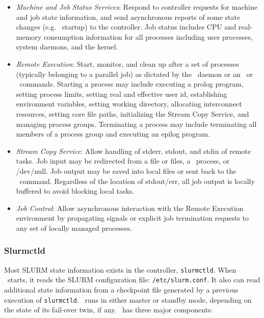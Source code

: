 \begin{itemize}
\item {\em Machine and Job Status Services}:  Respond to controller 
requests for machine and job state information, and send asynchronous 
reports of some state changes (e.g. \slurmd\ startup) to the controller.
Job status includes CPU and real-memory consumption information for all 
processes including user processes, system daemons, and the kernel. 

\item {\em Remote Execution}: Start, monitor, and clean up after a set
of processes (typically belonging to a parallel job) as dictated by the
\slurmctld\ daemon or an \srun\ or \scancel\ commands. Starting a process may
include executing a prolog program, setting process limits, setting real
and effective user id, establishing environment variables, setting working
directory, allocating interconnect resources, setting core file paths,
initializing the Stream Copy Service, and managing
process groups. Terminating a process may include terminating all members
of a process group and executing an epilog program.

\item {\em Stream Copy Service}: Allow handling of stderr, stdout, and
stdin of remote tasks. Job input may be redirected from a file or files, a
\srun\ process, or /dev/null.  Job output may be saved into local files or
sent back to the \srun\ command. Regardless of the location of stdout/err,
all job output is locally buffered to avoid blocking local tasks.

\item {\em Job Control}: Allow asynchronous interaction with the
Remote Execution environment by propagating signals or explicit job
termination requests to any set of locally managed processes.

\end{itemize}

\subsubsection{Slurmctld}

Most SLURM state information exists in the controller, {\tt slurmctld}.
When \slurmctld\ starts, it reads the SLURM configuration file: 
{\tt /etc/slurm.conf}.  It also can read additional state information
from a checkpoint file generated by a previous execution of {\tt slurmctld}.
\slurmctld\ runs in either master or standby mode, depending on the
state of its fail-over twin, if any.
\slurmctld\ has three major components:

